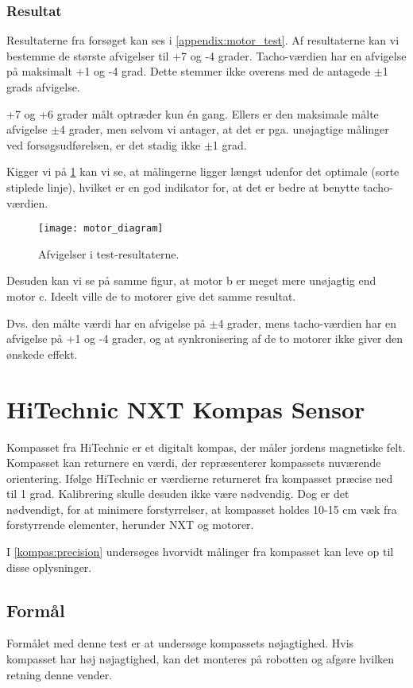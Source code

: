 \subsubsection{Resultat}
Resultaterne fra forsøget kan ses i \cref{appendix:motor_test}. 
Af resultaterne kan vi bestemme de største afvigelser til +7 og -4 grader.
Tacho-værdien har en afvigelse på maksimalt +1 og -4 grad.
Dette stemmer ikke overens med de antagede $\pm$1 grads afvigelse.

+7 og +6 grader målt optræder kun \'en gang.
Ellers er den maksimale målte afvigelse $\pm$4 grader, men selvom vi antager, at det er pga. unøjagtige målinger ved forsøgsudførelsen, er det stadig ikke $\pm$1 grad.

Kigger vi på \cref{sensor:motor_sensor_diagram} kan vi se, at målingerne ligger længst udenfor det optimale (sorte stiplede linje), hvilket er en god indikator for, at det er bedre at benytte tacho-værdien.

\begin{figure}
\texttt{[image: motor\_diagram]}
\caption{Afvigelser i test-resultaterne.}
\label{sensor:motor_sensor_diagram}
\end{figure}

Desuden kan vi se på samme figur, at motor b er meget mere unøjagtig end motor c.
Ideelt ville de to motorer give det samme resultat.

Dvs. den målte værdi har en afvigelse på $\pm$4 grader, mens tacho-værdien har en afvigelse på +1 og -4 grader, og at synkronisering af de to motorer ikke giver den ønskede effekt.

\section{HiTechnic NXT Kompas Sensor}
Kompasset fra HiTechnic er et digitalt kompas, der måler jordens magnetiske felt.
Kompasset kan returnere en værdi, der repræsenterer kompassets nuværende orientering.
Ifølge HiTechnic er værdierne returneret fra kompasset præcise ned til 1 grad.
Kalibrering skulle desuden ikke være nødvendig.
Dog er det nødvendigt, for at minimere forstyrrelser, at kompasset holdes 10-15 cm væk fra forstyrrende elementer, herunder \lego NXT og motorer.\cite{hitechnic_compass}

I \cref{kompas:precision} undersøges hvorvidt målinger fra kompasset kan leve op til disse oplysninger.

\subsection{Formål}
Formålet med denne test er at undersøge kompassets nøjagtighed.
Hvis kompasset har høj nøjagtighed, kan det monteres på robotten og afgøre hvilken retning denne vender.

